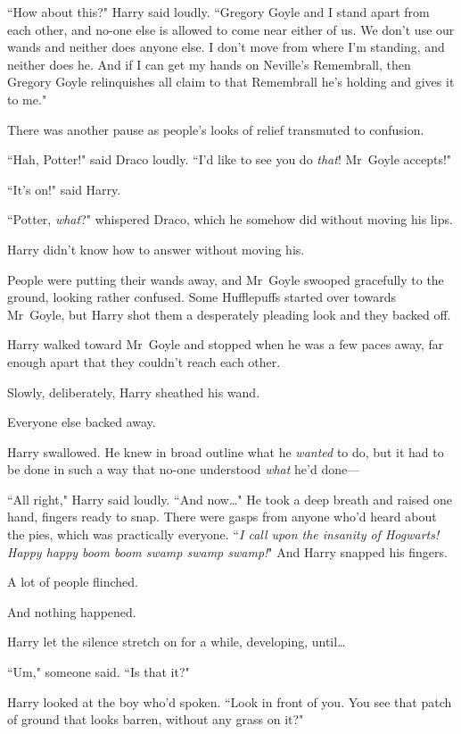 ``How about this?" Harry said loudly. ``Gregory Goyle and I stand apart from each other, and no-one else is allowed to come near either of us. We don't use our wands and neither does anyone else. I don't move from where I'm standing, and neither does he. And if I can get my hands on Neville's Remembrall, then Gregory Goyle relinquishes all claim to that Remembrall he's holding and gives it to me."

There was another pause as people's looks of relief transmuted to confusion.

``Hah, Potter!" said Draco loudly. ``I'd like to see you do \emph{that}! Mr~Goyle accepts!"

``It's on!" said Harry.

``Potter, \emph{what}?" whispered Draco, which he somehow did without moving his lips.

Harry didn't know how to answer without moving his.

People were putting their wands away, and Mr~Goyle swooped gracefully to the ground, looking rather confused. Some Hufflepuffs started over towards Mr~Goyle, but Harry shot them a desperately pleading look and they backed off.

Harry walked toward Mr~Goyle and stopped when he was a few paces away, far enough apart that they couldn't reach each other.

Slowly, deliberately, Harry sheathed his wand.

Everyone else backed away.

Harry swallowed. He knew in broad outline what he \emph{wanted} to do, but it had to be done in such a way that no-one understood \emph{what} he'd done—

``All right," Harry said loudly. ``And now{\ldots}" He took a deep breath and raised one hand, fingers ready to snap. There were gasps from anyone who'd heard about the pies, which was practically everyone. ``\emph{I call upon the insanity of Hogwarts! Happy happy boom boom swamp swamp swamp!}" And Harry snapped his fingers.

A lot of people flinched.

And nothing happened.

Harry let the silence stretch on for a while, developing, until{\ldots}

``Um," someone said. ``Is that it?"

Harry looked at the boy who'd spoken. ``Look in front of you. You see that patch of ground that looks barren, without any grass on it?"

